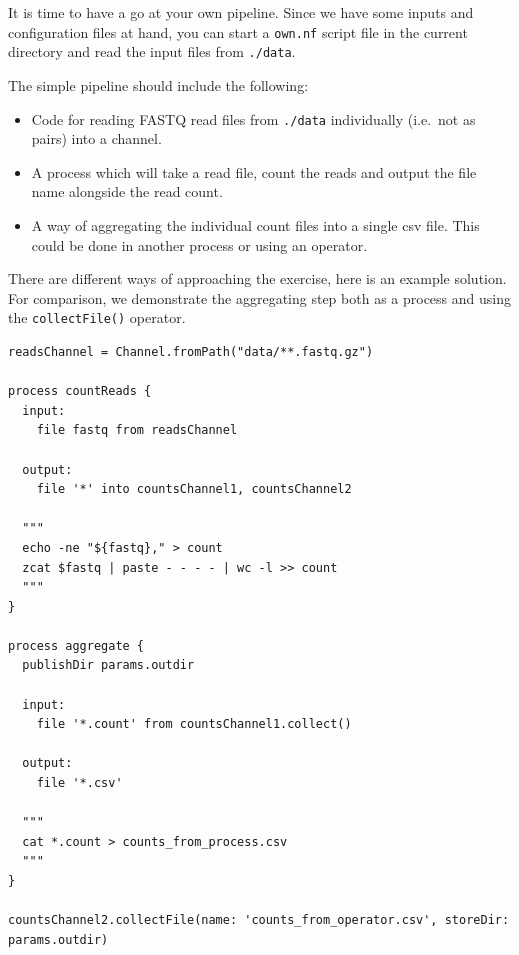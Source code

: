 It is time to have a go at your own pipeline. 
Since we have some inputs and configuration files at hand, 
you can start a \texttt{own.nf} script file in the current 
directory and read the input files from \texttt{./data}. 



\begin{questions}
The simple pipeline should include the following:

\begin{itemize}
\item Code for reading FASTQ read files from \texttt{./data} individually (i.e.\ not as pairs) into a channel.
\item A process which will take a read file, count the reads and output the file name alongside the read count.
\item A way of aggregating the individual count files into a single csv file. This could be done in another process or using an operator. 
\end{itemize}

\begin{answer}

There are different ways of approaching the exercise, 
here is an example solution.
For comparison, we demonstrate the aggregating step both as a process
and using the \texttt{collectFile()} operator. 

\begin{lstlisting}
readsChannel = Channel.fromPath("data/**.fastq.gz") 

process countReads {
  input:
    file fastq from readsChannel

  output:
    file '*' into countsChannel1, countsChannel2

  """
  echo -ne "${fastq}," > count
  zcat $fastq | paste - - - - | wc -l >> count
  """
}

process aggregate {
  publishDir params.outdir

  input:
    file '*.count' from countsChannel1.collect()

  output:
    file '*.csv'

  """
  cat *.count > counts_from_process.csv
  """
}

countsChannel2.collectFile(name: 'counts_from_operator.csv', storeDir: params.outdir)
\end{lstlisting}
\end{answer}

\end{questions}

